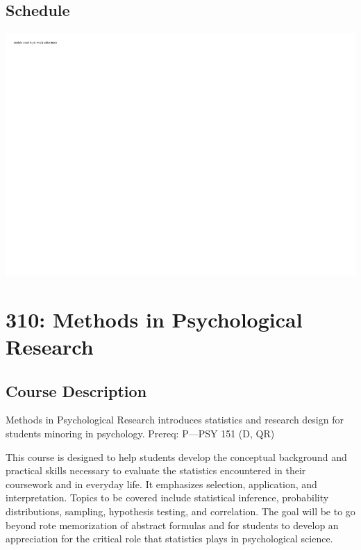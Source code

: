 \hypertarget{schedule}{%
\section*{Schedule}\label{schedule}}


\includegraphics{0201_personality_files/figure-latex/unnamed-chunk-3-1.pdf}

\hypertarget{statsminor}{%
\chapter*{310: Methods in Psychological Research}\label{statsminor}}


\hypertarget{course-description-1}{%
\section*{Course Description}\label{course-description-1}}


Methods in Psychological Research introduces statistics and research design for students minoring in psychology. Prereq: P---PSY 151 (D, QR)

This course is designed to help students develop the conceptual background and practical skills necessary to evaluate the statistics encountered in their coursework and in everyday life. It emphasizes selection, application, and interpretation. Topics to be covered include statistical inference, probability distributions, sampling, hypothesis testing, and correlation. The goal will be to go beyond rote memorization of abstract formulas and for students to develop an appreciation for the critical role that statistics plays in psychological science.

